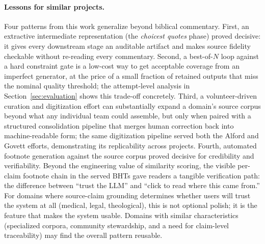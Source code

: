 \paragraph{Lessons for similar projects.}
Four patterns from this work generalize beyond biblical commentary. First, an extractive intermediate representation (the \emph{choicest quotes} phase) proved decisive: it gives every downstream stage an auditable artifact and makes source fidelity checkable without re-reading every commentary. Second, a best-of-$N$ loop against a hard constraint gate is a low-cost way to get acceptable coverage from an imperfect generator, at the price of a small fraction of retained outputs that miss the nominal quality threshold; the attempt-level analysis in Section~\ref{sec:evaluation} shows this trade-off concretely. Third, a volunteer-driven curation and digitization effort can substantially expand a domain's source corpus beyond what any individual team could assemble, but only when paired with a structured consolidation pipeline that merges human correction back into machine-readable form; the same digitization pipeline served both the Alford and Govett efforts, demonstrating its replicability across projects. Fourth, automated footnote generation against the source corpus proved decisive for credibility and verifiability. Beyond the engineering value of similarity scoring, the visible per-claim footnote chain in the served BHTs gave readers a tangible verification path: the difference between ``trust the LLM'' and ``click to read where this came from.'' For domains where source-claim grounding determines whether users will trust the system at all (medical, legal, theological), this is not optional polish; it is the feature that makes the system usable. Domains with similar characteristics (specialized corpora, community stewardship, and a need for claim-level traceability) may find the overall pattern reusable.
